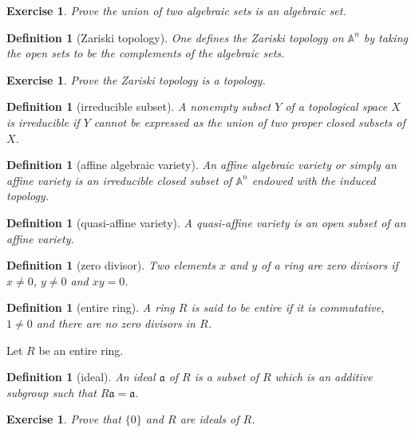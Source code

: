 \documentclass[12pt]{article}
\newtheorem{definition}[proposition]{Definition}
\newtheorem{ex}[proposition]{Exercise}
\begin{document}
\begin{ex}
	Prove the union of two algebraic sets is an algebraic set.
\end{ex}		

\begin{definition}[Zariski topology]
	One defines the Zariski topology on $\mathbb{A}^n$ by taking the open sets to be the complements of the algebraic sets.
\end{definition}

\begin{ex}
	Prove the Zariski topology is a topology. 
\end{ex}

\begin{definition}[irreducible subset]
	A nonempty subset $Y$ of a topological space $X$ is irreducible if $Y$ cannot be expressed as the union of two proper closed subsets of $X$. 
\end{definition}

\begin{definition}[affine algebraic variety]
	An affine algebraic variety or simply an affine variety is an irreducible closed subset of $\mathbb{A}^n$ endowed with the induced topology. 
\end{definition}

\begin{definition}[quasi-affine variety]
	A quasi-affine variety is an open subset of an affine variety. 
\end{definition}

\begin{definition}[zero divisor]
	Two elements $x$ and $y$ of a ring are zero divisors if $x \neq 0$, $y \neq 0$ and $x y = 0$.
\end{definition}

\begin{definition}[entire ring]
	A ring $R$ is said to be entire if it is commutative, $1 \neq 0$ and there are no zero divisors in $R$. 
\end{definition}

Let $R$ be an entire ring. 

\begin{definition}[ideal]
	An ideal $\mathfrak{a}$ of $R$ is a subset of $R$ which is an additive subgroup such that $R\mathfrak{a} = \mathfrak{a}$.
\end{definition}

\begin{ex}
	Prove that $\lbrace 0 \rbrace$ and $R$ are ideals of $R$.
\end{ex}
\end{document}
